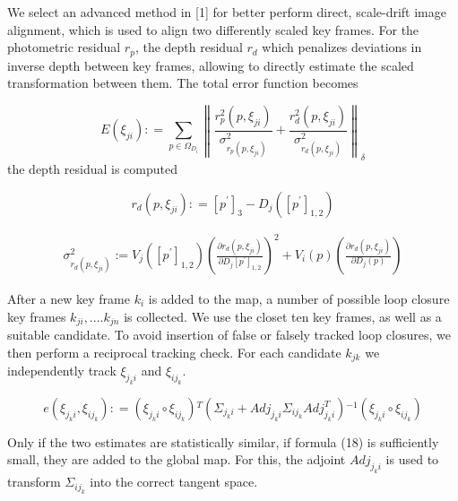 We select an advanced method in [1] for better perform direct, scale-drift image alignment, which is used to align two differently scaled key frames. For the photometric residual ${r_p}$, the depth residual ${r_d}$ which penalizes deviations in inverse depth between key frames, allowing to directly estimate the scaled transformation between them. The total error function becomes

\begin{equation}
E({\xi _{ji}}): = {\sum\limits_{p \in {\Omega _{{D_i}}}} {\left\| {\frac{{r_p^2(p,{\xi _{ji}})}}{{\sigma _{{r_p}(p,{\xi _{ji}})}^2}} + \frac{{r_d^2(p,{\xi _{ji}})}}{{\sigma _{{r_d}(p,{\xi _{ji}})}^2}}} \right\|} _\delta }
\end{equation}
the depth residual is computed

\begin{equation}
r_{d}(p,\xi _{ji}): = [p^{'}]_{3} - D_{j}([p^{'}]_{1,2})
\end{equation}

\begin{equation}
\begin{split}
\sigma_{r_{d}(p,\xi_{ji})} ^{2} :=V_{j}( [ p^{'} ]_{1,2} )  {\left( \frac {\partial r_{d}(p,\xi_{ji})} {\partial D_{j} \left[ p^{'} \right]_{1,2}}  \right)^{2}} + V_{i}(p) \left( \frac {\partial r_{d}(p,\xi_{ji})} {\partial D_{j}(p)} \right)
\end{split}
\end{equation}

After a new key frame ${k_i}$ is added to the map, a number of possible loop closure key frames ${k_{ji}},....{k_{jn}}$ is collected. We use the closet ten key frames, as well as a suitable candidate. To avoid insertion of false or falsely tracked loop closures, we then perform a reciprocal tracking check. For each candidate ${k_{jk}}$ we independently track ${\xi _{{j_k}i}}$ and ${\xi _{i{j_k}}}$.

\begin{equation}
e\!(\!{\xi _{{j_k}i}},{\xi _{i{j_k}}})\!: \!= \!{\!(\!{\xi _{{j_k}i}} \!\circ \!{\xi _{i{j_k}}})\!^T}{\!(\!{\Sigma _{{j_k}i}}\! +\! Ad{j_{{j_k}i}}{\Sigma _{i{j_k}}}Adj_{{j_k}i}^T\!)\!^{ - 1}}\!(\!{\xi _{{j_k}i}}\! \circ\! {\xi _{i{j_k}}}\!)
\end{equation}

Only if the two estimates are statistically similar, if formula (18) is sufficiently small, they are added to the global map. For this, the adjoint $Ad{j_{{j_k}i}}$ is used to transform ${\Sigma _{i{j_k}}}$ into the correct tangent space.


